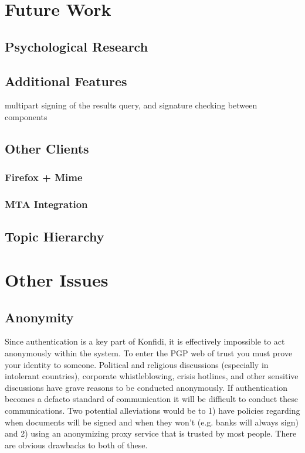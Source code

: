 \documentclass[onecolumn]{acm_proc_article-sp}
\begin{document}
\section{Future Work}
\subsection{Psychological Research}
\subsection{Additional Features}
multipart signing of the results query, and signature checking between components
\subsection{Other Clients}
\subsubsection{Firefox + Mime}
\subsubsection{MTA Integration}
\subsection{Topic Hierarchy}
\section{Other Issues}
\subsection{Anonymity}
Since authentication is a key part of Konfidi, it is effectively impossible to act anonymously within the system.  To enter the PGP web of trust you must prove your identity to someone.  Political and religious discussions (especially in intolerant countries), corporate whistleblowing, crisis hotlines, and other sensitive discussions have grave reasons to be conducted anonymously.  If authentication becomes a defacto standard of communication it will be difficult to conduct these communications.  Two potential alleviations would be to 1) have policies regarding when documents will be signed and when they won't (e.g. banks will always sign) and 2) using an anonymizing proxy service that is trusted by most people.  There are obvious drawbacks to both of these.\cite{fenton05iim}
\end{document}
